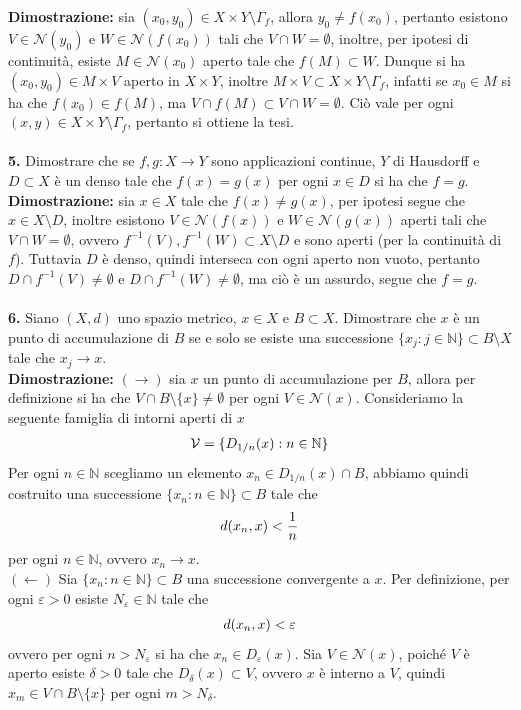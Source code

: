 \documentclass{article}
\begin{document}
\textbf{Dimostrazione:} sia $(x_0, y_0) \in X \times Y \setminus \Gamma_f$, allora $y_0 \neq f(x_0)$, pertanto esistono $V \in \mathcal{N}(y_0)$ e $W \in \mathcal{N}(f(x_0))$ tali che $V \cap W = \emptyset$, inoltre, per ipotesi di continuità, esiste $M \in \mathcal{N}(x_0)$ aperto tale che $f(M) \subset W$. Dunque si ha $(x_0, y_0) \in M \times V$ aperto in $X \times Y$, inoltre $M \times V \subset X \times Y \setminus \Gamma_f$, infatti se $x_0 \in M$ si ha che $f(x_0) \in f(M)$, ma $V \cap f(M) \subset V \cap W = \emptyset$. Ciò vale per ogni $(x, y) \in X \times Y \setminus \Gamma_f$, pertanto si ottiene la tesi. \\ \\
\textbf{5.} Dimostrare che se $f, g : X \longrightarrow Y$ sono applicazioni continue, $Y$ di Hausdorff e $D \subset X$ è un denso tale che $f(x) = g(x)$ per ogni $x \in D$ si ha che $f = g$. \\

\textbf{Dimostrazione:} sia $x \in X$ tale che $f(x) \neq g(x)$, per ipotesi segue che $x \in X \setminus D$, inoltre esistono $V \in \mathcal{N}(f(x))$ e $W \in \mathcal{N}(g(x))$ aperti tali che $V \cap W = \emptyset$, ovvero $f^{-1}(V), f^{-1}(W) \subset X \setminus D$ e sono aperti (per la continuità di $f$). Tuttavia $D$ è denso, quindi interseca con ogni aperto non vuoto, pertanto $D \cap f^{-1}(V) \neq \emptyset$ e $D \cap f^{-1}(W) \neq \emptyset$, ma ciò è un assurdo, segue che $f = g$. \\ \\
\textbf{6.} Siano $(X, d)$ uno spazio metrico, $x \in X$ e $B \subset X$. Dimostrare che $x$ è un punto di accumulazione di $B$ se e solo se esiste una successione $\{x_j : j \in \mathbb{N}\} \subset B\setminus X$ tale che $x_j \rightarrow x$. \\

\textbf{Dimostrazione:} $(\rightarrow)$ sia $x$ un punto di accumulazione per $B$, allora per definizione si ha che $V \cap B \setminus \{x\} \neq \emptyset$ per ogni $V \in \mathcal{N}(x)$. Consideriamo la seguente famiglia di intorni aperti di $x$
\begin{align}
    \mathcal{V} = \{D_{1/n}(x) : n \in \mathbb{N}\} \notag
\end{align}
Per ogni $n \in \mathbb{N}$ scegliamo un elemento $x_n \in D_{1/n}(x) \cap B$, abbiamo quindi costruito una successione $\{x_n : n \in \mathbb{N}\} \subset B$ tale che
\begin{align}
    d(x_n, x) < \frac{1}{n} \notag
\end{align}
per ogni $n \in \mathbb{N}$, ovvero $x_n \rightarrow x$. \\
$(\leftarrow)$ Sia $\{x_n : n \in \mathbb{N}\} \subset B$ una successione convergente a $x$. Per definizione, per ogni $\varepsilon > 0$ esiste $N_\varepsilon \in \mathbb{N}$ tale che
\begin{align}
    d(x_n, x) < \varepsilon \notag
\end{align}
ovvero per ogni $n > N_\varepsilon$ si ha che $x_n \in D_{\varepsilon}(x)$. Sia $V \in \mathcal{N}(x)$, poiché $V$ è aperto esiste $\delta > 0$ tale che $D_\delta(x) \subset V$, ovvero $x$ è interno a $V$, quindi $x_m \in V \cap B \setminus \{x\}$ per ogni $m > N_\delta$.
\end{document}

